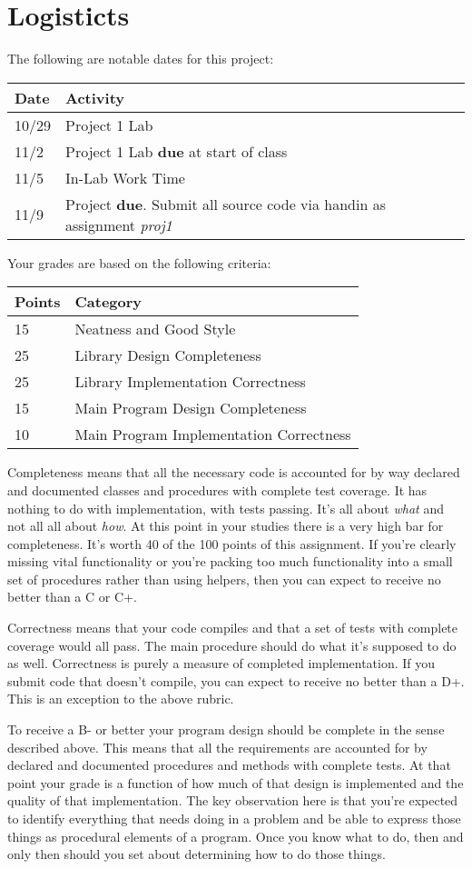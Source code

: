 \documentclass[10pt]{article}
\begin{document}
\section{Logisticts}

The following are notable dates for this project:
\begin{center}
\begin{tabular}{ll}
Date & Activity \\ \hline
10/29 & Project 1 Lab \\
11/2 & Project 1 Lab \textbf{due} at start of class \\
11/5 & In-Lab Work Time \\
11/9 & Project \textbf{due}. Submit all source code via handin as assignment \textit{proj1} 
\end{tabular}
\end{center}

Your grades are based on the following criteria:
\begin{center}
\begin{tabular}{ll}
Points & Category \\ \hline
15  & Neatness and Good Style \\
25  & Library Design Completeness \\
25  & Library Implementation Correctness \\
15  & Main Program Design Completeness \\
10  & Main Program Implementation Correctness     
\end{tabular}
\end{center}

Completeness means that all the necessary code is accounted for by way declared and documented classes and procedures with complete test coverage. It has nothing to do with implementation, with tests passing. It's all about \textit{what} and not all all about \textit{how}. At this point in your studies there is a very high bar for completeness.  It's worth 40 of the 100 points of this assignment. If you're clearly missing vital functionality or you're packing too much functionality into a small set of procedures rather than using helpers, then you can expect to receive no better than a C or C+. 

Correctness means that your code compiles and that a set of tests with complete coverage would all pass. The main procedure should do what it's supposed to do as well.  Correctness is purely a measure of completed implementation.  If you submit code that doesn't compile, you can expect to receive no better than a D+.  This is an exception to the above rubric. 

To receive a B- or better your program design should be complete in the sense described above. This means that all the requirements are accounted for by declared and documented procedures and methods with complete tests. At that point your grade is a function of how much of that design is implemented and the quality of that implementation. The key observation here is that you're expected to identify everything that needs doing in a problem and be able to express those things as procedural elements of a program.  Once you know what to do, then and only then should you set about determining how to do those things.    
\end{document}
